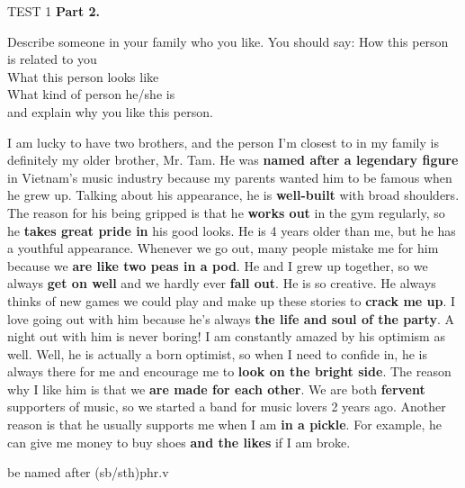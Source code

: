\begin{glossarymc}[Cambridge 6]
\begin{test}{TEST 1}
    \noindent
    \textbf{Part 2.}
    \begin{qa}{Describe someone in your family who you like. You should say:}
    How this person is related to you\\
    What this person looks like\\
    What kind of person he/she is\\
    and explain why you like this person.

    I am lucky to have two brothers, and the person I'm closest to in my family is definitely my older brother, Mr. Tam. He was \textbf{named after a legendary figure} in Vietnam's music industry because my parents wanted him to be famous when he grew up. Talking about his appearance, he is \textbf{well-built} with broad shoulders. The reason for his being gripped is that he \textbf{works out} in the gym regularly, so he \textbf{takes great pride in} his good looks. He is 4 years older than me, but he has a youthful appearance. Whenever we go out, many people mistake me for him because we \textbf{are like two peas in a pod}. He and I grew up together, so we always \textbf{get on well} and we hardly ever \textbf{fall out}. He is so creative. He always thinks of new games we could play and make up these stories to \textbf{crack me up}. I love going out with him because he's always \textbf{the life and soul of the party}. A night out with him is never boring! I am constantly amazed by his optimism as well. Well, he is actually a born optimist, so when I need to confide in, he is always there for me and encourage me to \textbf{look on the bright side}. The reason why I like him is that we \textbf{are made for each other}. We are both \textbf{fervent} supporters of music, so we started a band for music lovers 2 years ago. Another reason is that he usually supports me when I am \textbf{in a pickle}. For example, he can give me money to buy shoes \textbf{and the likes} if I am broke.
    \end{qa}

        \begin{VocabExplain}[Part 2]
            \begin{ExplainCard}{be named after (sb/sth)}{phr.v}
            \end{ExplainCard}
            


\end{VocabExplain}
\end{test}
\end{glossarymc}
